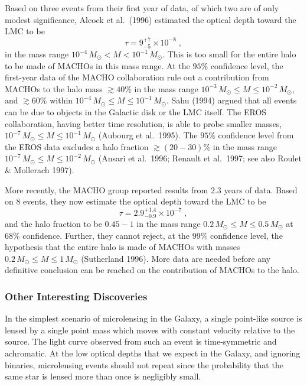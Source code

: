 \documentclass[a4paper,10pt]{article} %
\newcommand{\ga}{\gtrsim}
\begin{document}
Based on three events from their first year of data, of which two are
of only modest significance, Alcock et al.\ (1996) estimated the
optical depth toward the LMC to be
\begin{equation}
  \tau = 9^{+7}_{-5}\times10^{-8}\;,
\label{eq:2.36}
\end{equation}
in the mass range $10^{-4}\,M_\odot<M<10^{- 1}\,M_\odot$. This is too
small for the entire halo to be made of MACHOs in this mass range. At
the $95\%$ confidence level, the first-year data of the MACHO
collaboration rule out a contribution from MACHOs to the halo mass
$\ga40\%$ in the mass range $10^{-3}\,M_\odot\le
M\le10^{-2}\,M_\odot$, and $\ga60\%$ within $10^{-4}\,M_\odot\le
M\le10^{-1}\,M_\odot$. Sahu (1994) argued that all events can be due
to objects in the Galactic disk or the LMC itself. The EROS
collaboration, having better time resolution, is able to probe smaller
masses, $10^{-7}\,M_\odot\le M\le10^{-1}\,M_\odot$ (Aubourg et al.\
1995). The $95\%$ confidence level from the EROS data excludes a halo
fraction $\ga(20-30)\%$ in the mass range $10^{-7}\,M_\odot\le
M\le10^{-2}\,M_\odot$ (Ansari et al.\ 1996; Renault et al.\ 1997; see
also Roulet \& Mollerach 1997).

More recently, the MACHO group reported results from 2.3 years of
data. Based on 8 events, they now estimate the optical depth toward
the LMC to be
\begin{equation}
  \tau=2.9^{+1.4}_{-0.9}\times10^{-7}\;,
\label{eq:2.36a}
\end{equation}
and the halo fraction to be $0.45-1$ in the mass range
$0.2\,M_\odot\le M\le0.5\,M_\odot$ at 68\% confidence. Further, they
cannot reject, at the 99\% confidence level, the hypothesis that the
entire halo is made of MACHOs with masses $0.2\,M_\odot\le
M\le1\,M_\odot$ (Sutherland 1996). More data are needed before any
definitive conclusion can be reached on the contribution of MACHOs to
the halo.

\subsubsection{Other Interesting Discoveries}
\label{NB:subsubsect2.2.4}

In the simplest scenario of microlensing in the Galaxy, a single
point-like source is lensed by a single point mass which moves with
constant velocity relative to the source. The light curve observed
from such an event is time-symmetric and achromatic. At the low
optical depths that we expect in the Galaxy, and ignoring binaries,
microlensing events should not repeat since the probability that the
same star is lensed more than once is negligibly small.
\end{document}
